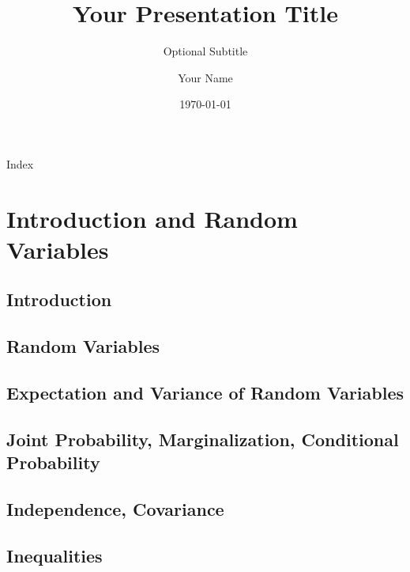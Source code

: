 \documentclass[4pt]{beamer} %
\title[Short Title]{Your Presentation Title}
\subtitle{Optional Subtitle}
\author[]{Your Name}
\institute[IIT Bombay]{University / Company Name}
\date{\today}
\begin{document}


\begin{frame}{Index}
    \tableofcontents
\end{frame}

\section{Introduction and Random Variables}



\subsection{Introduction}
{


}


\subsection{Random Variables}
{

}

\subsection{Expectation and Variance of Random Variables}
{


}


\subsection{Joint Probability, Marginalization, Conditional Probability}
{


}

\subsection{Independence, Covariance}
{



}


\subsection{Inequalities}
{


}
\end{document}

